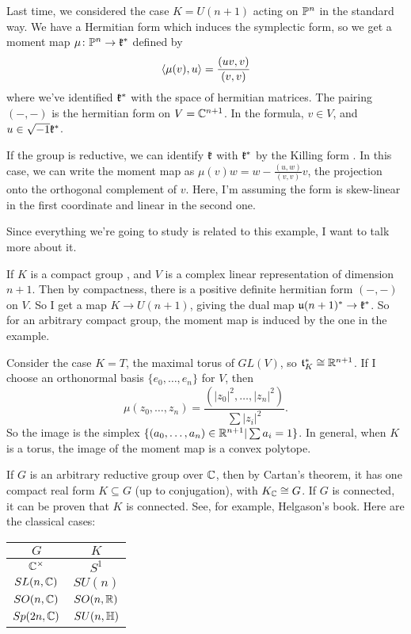 
Last time, we considered the case $K=U(n+1)$ acting on $\mathbb{P}^n$ in the standard way. We have a Hermitian form which induces the symplectic form, so we get a moment map $\mu\colon \mathbb{P}^n\to \mathfrak{k}^*$ defined by
\[
 \langle\mu(v),u\rangle=\frac{(uv,v)}{(v,v)}
\]
where we've identified $\mathfrak{k}^*$ with the space of hermitian matrices. The pairing $(-,-)$ is the hermitian form on $V=\mathbb{C}^{n+1}$. In the formula, $v\in V$, and $u\in \sqrt{-1}\mathfrak{k}^*$.

If the group is reductive, we can identify $\mathfrak{k}$ with $\mathfrak{k}^*$ by the Killing form . In this case, we can write the moment map as $\mu(v)w=w-\frac{(u,w)}{(v,v)}v$, the projection onto the orthogonal complement of $v$. Here, I'm assuming the form is skew-linear in the first coordinate and linear in the second one.

Since everything we're going to study is related to this example, I want to talk more about it.

If $K$ is a compact group , and $V$ is a complex linear representation of dimension $n+1$. Then by compactness, there is a positive definite hermitian form $(-,-)$ on $V$. So I get a map $K\to U(n+1)$, giving the dual map $\mathfrak u(n+1)^*\to \mathfrak{k}^*$. So for an arbitrary compact group, the moment map is induced by the one in the example.

Consider the case $K=T$, the maximal torus of $GL(V)$, so $\mathfrak{t}_K^*\cong \mathbb{R}^{n+1}$. If I choose an orthonormal basis $\{e_0,\dots, e_n\}$ for $V$, then 
\[
 \mu(z_0,\dots, z_n)= \frac{(|z_0|^2,\dots, |z_n|^2)}{\sum |z_i|^2}.
\]
So the image is the simplex $\{(a_0,\dots, a_n)\in \mathbb{R}^{n+1}|\sum a_i=1\}$. In general, when $K$ is a torus, the image of the moment map is a convex polytope.

If $G$ is an arbitrary reductive group over $\mathbb{C}$, then by Cartan's theorem, it has one compact real form $K\subseteq G$ (up to conjugation), with $K_{\mathbb{C}}\cong G$. If $G$ is connected, it can be proven that $K$ is connected. See, for example, Helgason's book. Here are the classical cases:

\begin{tabular}{c|c}
 $G$ & $K$\\ \hline
 \rule{0pt}{2.5ex}$\mathbb{C}^\times$ & $S^1$\\
 $SL(n,\mathbb{C})$ & $SU(n)$\\
 $SO(n,\mathbb{C})$ & $SO(n,\mathbb{R})$\\
 $Sp(2n,\mathbb{C})$ & $SU(n,\mathbb{H})$
\end{tabular}

